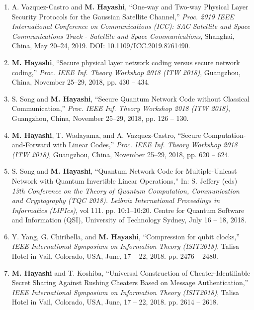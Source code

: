 \documentclass[a4paper,12pt,oneside]{article}
\begin{document}
\begin{enumerate}
\item 
A. Vazquez-Castro and \textbf{M. Hayashi}, 
``One-way and Two-way Physical Layer Security Protocols for the Gaussian Satellite Channel,'' 
{\em Proc. 2019 IEEE International Conference on Communications (ICC): SAC Satellite and Space Communications Track - Satellite and Space Communications},
Shanghai, China, May 20--24, 2019. DOI: 10.1109/ICC.2019.8761490.

\item 
\textbf{M. Hayashi}, 
``Secure physical layer network coding versus secure network coding,''
{\em Proc. IEEE Inf. Theory Workshop 2018 (ITW 2018)}, 
Guangzhou, China, November 25--29, 2018, pp. 430 -- 434. 

\item 
S. Song and \textbf{M. Hayashi}, 
``Secure Quantum Network Code without Classical Communication,''
{\em Proc. IEEE Inf. Theory Workshop 2018 (ITW 2018)}, 
Guangzhou, China, November 25--29, 2018, pp. 126 -- 130. 

\item 
\textbf{M. Hayashi}, T. Wadayama, and A. Vazquez-Castro,
``Secure Computation-and-Forward with Linear Codes,''
{\em Proc. IEEE Inf. Theory Workshop 2018 (ITW 2018)}, 
Guangzhou, China, November 25--29, 2018, pp. 620 -- 624. 

\item 
S. Song and \textbf{M. Hayashi}, 
``Quantum Network Code for Multiple-Unicast Network with Quantum Invertible Linear Operations,''
In: S. Jeffery (eds) 
{\em 13th Conference on the Theory of Quantum Computation, Communication and Cryptography (TQC 2018). Leibniz International Proceedings in Informatics (LIPIcs)},
 vol 111. pp. 10:1--10:20.
Centre for Quantum Software and Information (QSI), University of Technology Sydney, 
July 16 -- 18, 2018.

\item 
Y. Yang, G. Chiribella, and \textbf{M. Hayashi},
``Compression for qubit clocks,''
{\em IEEE International Symposium on Information Theory (ISIT2018)}, 
Talisa Hotel in Vail, Colorado, USA, June, 17 -- 22, 2018.
pp. 2476 -- 2480.

\item 
 \textbf{M. Hayashi} and T. Koshiba,
``Universal Construction of Cheater-Identifiable Secret Sharing Against Rushing Cheaters Based on Message Authentication,''
{\em IEEE International Symposium on Information Theory (ISIT2018)}, 
 Talisa Hotel in Vail, Colorado, USA, June, 17 -- 22, 2018.
pp. 2614 -- 2618.


\end{enumerate}
\end{document}

